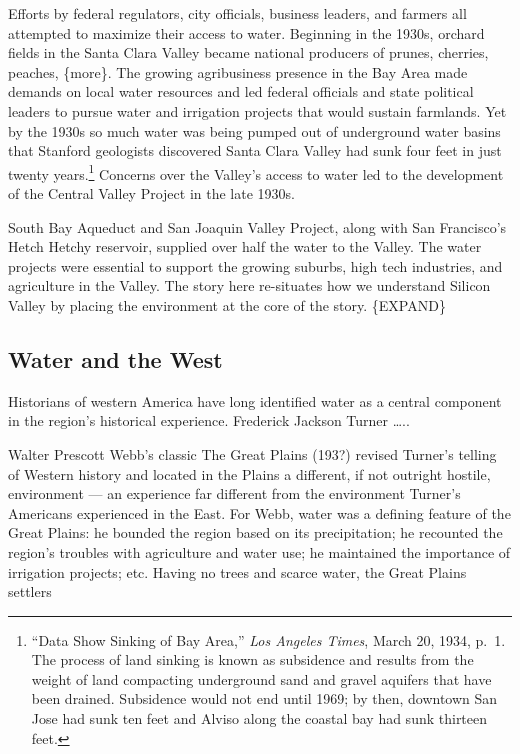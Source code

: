 \documentclass[11pt,article,oneside]{memoir}
\begin{document}
Efforts by federal regulators, city officials, business leaders, and
farmers all attempted to maximize their access to water. Beginning in
the 1930s, orchard fields in the Santa Clara Valley became national
producers of prunes, cherries, peaches, \{more\}. The growing
agribusiness presence in the Bay Area made demands on local water
resources and led federal officials and state political leaders to
pursue water and irrigation projects that would sustain farmlands. Yet
by the 1930s so much water was being pumped out of underground water
basins that Stanford geologists discovered Santa Clara Valley had sunk
four feet in just twenty years.\footnote{``Data Show Sinking of Bay
  Area,'' \emph{Los Angeles Times}, March 20, 1934, p.~1. The process of
  land sinking is known as subsidence and results from the weight of
  land compacting underground sand and gravel aquifers that have been
  drained. Subsidence would not end until 1969; by then, downtown San
  Jose had sunk ten feet and Alviso along the coastal bay had sunk
  thirteen feet.} Concerns over the Valley's access to water led to the
development of the Central Valley Project in the late 1930s.

South Bay Aqueduct and San Joaquin Valley Project, along with San
Francisco's Hetch Hetchy reservoir, supplied over half the water to the
Valley. The water projects were essential to support the growing
suburbs, high tech industries, and agriculture in the Valley. The story
here re-situates how we understand Silicon Valley by placing the
environment at the core of the story. \{EXPAND\}

\subsection{Water and the West}

Historians of western America have long identified water as a central
component in the region's historical experience. Frederick Jackson
Turner \ldots{}..

Walter Prescott Webb's classic The Great Plains (193?) revised Turner's
telling of Western history and located in the Plains a different, if not
outright hostile, environment --- an experience far different from the
environment Turner's Americans experienced in the East. For Webb, water
was a defining feature of the Great Plains: he bounded the region based
on its precipitation; he recounted the region's troubles with
agriculture and water use; he maintained the importance of irrigation
projects; etc. Having no trees and scarce water, the Great Plains
settlers
\end{document}
